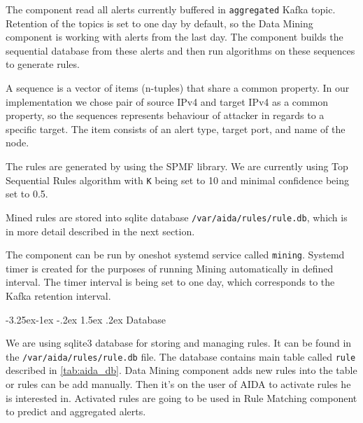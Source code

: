 \documentclass[a4paper]{article} %
\makeatletter
\renewcommand\subsection{\@startsection{subsection}{2}{\z@}%
                   {-3.25ex\@plus -1ex \@minus -.2ex}%
                   {1.5ex \@plus .2ex}%
                   {\normalfont\sffamily\large\bfseries\color{projectcolor}}}
\makeatother
\begin{document}
The component read all alerts currently buffered in \texttt{aggregated} Kafka topic. Retention of the topics is set to one day by default, so the Data Mining component is working with alerts from the last day. The component builds the sequential database from these alerts and then run algorithms on these sequences to generate rules.

A sequence is a vector of items (n-tuples) that share a common property. In our implementation we chose pair of source IPv4 and target IPv4 as a common property, so the sequences represents behaviour of attacker in regards to a specific target. The item consists of an alert type, target port, and name of the node.

The rules are generated by using the SPMF library. We are currently using Top Sequential Rules algorithm with \texttt{K} being set to 10 and minimal confidence being set to 0.5.

Mined rules are stored into sqlite database \texttt{/var/aida/rules/rule.db}, which is in more detail described in the next section.

The component can be run by oneshot systemd service called \texttt{mining}. Systemd timer is created for the purposes of running Mining automatically in defined interval. The timer interval is being set to one day, which corresponds to the Kafka retention interval.


\subsection{Database}

We are using sqlite3 database for storing and managing rules. It can be found in the \texttt{/var/aida/rules/rule.db} file. The database contains main table called \texttt{rule} described in \autoref{tab:aida_db}. Data Mining component adds new rules into the table or rules can be add manually. Then it's on the user of AIDA to activate rules he is interested in. Activated rules are going to be used in Rule Matching component to predict and aggregated alerts.
\end{document}
